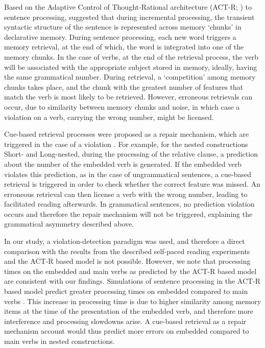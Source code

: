 Based on the Adaptive Control of Thought-Rational architecture (ACT-R; \citet{anderson2013architecture}) to sentence processing, \citet{lewis2005activation} suggested that during incremental processing, the transient syntactic structure of the sentence is represented across memory `chunks’ in declarative memory. During sentence processing, each new word triggers a memory retrieval, at the end of which, the word is integrated into one of the memory chunks. In the case of verbs, at the end of the retrieval process, the verb will be associated with the appropriate subject stored in memory, ideally, having the same grammatical number. During retrieval, a `competition' among memory chunks takes place, and the chunk with the greatest number of features that match the verb is most likely to be retrieved. However, erroneous retrievals can occur, due to similarity between memory chunks and noise, in which case a violation on a verb, carrying the wrong number, might be licensed. 

Cue-based retrieval processes were proposed as a repair mechanism, which are triggered in the case of a violation \citep{wagers2009agreement, lago2015agreement}. For example, for the nested constructions Short- and Long-nested, during the processing of the relative clause, a prediction about the number of the embedded verb is generated. If the embedded verb violates this prediction, as in the case of ungrammatical sentences, a cue-based retrieval is triggered in order to check whether the correct feature was missed. An erroneous retrieval can then license a verb with the wrong number, leading to facilitated reading afterwards. In grammatical sentences, no prediction violation occurs and therefore the repair mechanism will not be triggered, explaining the grammatical asymmetry described above. 

In our study, a violation-detection paradigm was used, and therefore a direct comparison with the results from the described self-paced reading experiments and the ACT-R based model is not possible. However, we note that processing times on the embedded and main verbs as predicted by the ACT-R based model are consistent with our findings. Simulations of sentence processing in the ACT-R based model predict greater processing times on embedded compared to main verbs \citep{lewis2005activation}. This increase in processing time is due to higher similarity among memory items at the time of the presentation of the embedded verb, and therefore more interference and processing slowdowns arise. A cue-based retrieval as a repair mechanism account would thus predict more errors on embedded compared to main verbs in nested constructions. 

